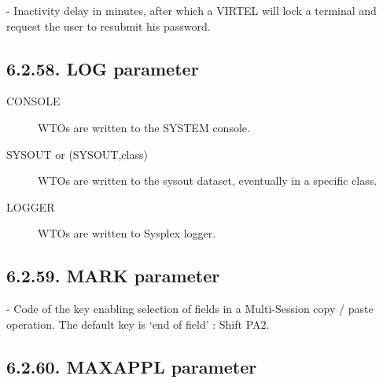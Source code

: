 \documentclass[letterpaper,10pt,english]{sphinxmanual}
\begin{document}
 - Inactivity delay in minutes, after which a VIRTEL will lock a terminal and request the user to resubmit his password.


\subsection{6.2.58. LOG parameter}
\label{\detokenize{Installation_Guide:log-parameter}}
\begin{sphinxVerbatim}[commandchars=\\\{\}]
                  
\end{sphinxVerbatim}
\begin{description}
\item[{CONSOLE}] \leavevmode
WTOs are written to the SYSTEM console.

\item[{SYSOUT or (SYSOUT,class)}] \leavevmode
WTOs are written to the sysout dataset, eventually in a specific class.

\item[{LOGGER}] \leavevmode
WTOs are written to Sysplex logger.

\end{description}


\subsection{6.2.59. MARK parameter}
\label{\detokenize{Installation_Guide:mark-parameter}}
\begin{sphinxVerbatim}[commandchars=\\\{\}]
                              
\end{sphinxVerbatim}

 - Code of the key enabling selection of fields in a Multi-Session copy / paste operation. The default key is ‘end of field’ : Shift PA2.


\subsection{6.2.60. MAXAPPL parameter}
\label{\detokenize{Installation_Guide:maxappl-parameter}}
\begin{sphinxVerbatim}[commandchars=\\\{\}]
                            
\end{sphinxVerbatim}
\end{document}
